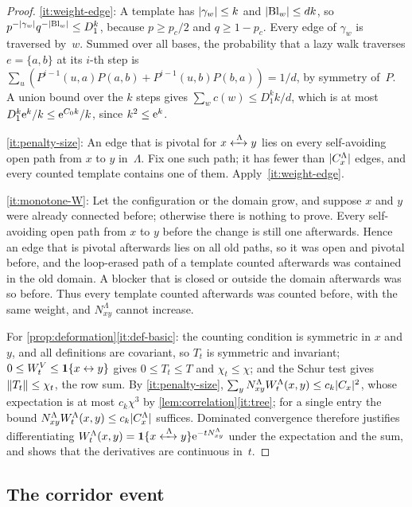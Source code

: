 \begin{proof}
\ref{it:weight-edge}: A template has $\lvert\gamma_w\rvert\le k$ and $\lvert\mathrm{Bl}_w\rvert\le dk$, so
$p^{-\lvert\gamma_w\rvert}q^{-\lvert\mathrm{Bl}_w\rvert}\le D_1^k$, because $p\ge p_c/2$ and $q\ge1-p_c$. Every edge of
$\gamma_w$ is traversed by~$w$. Summed over all bases, the probability that a lazy walk traverses
$e=\{a,b\}$ at its $i$-th step is $\sum_u(P^{i-1}(u,a)P(a,b)+P^{i-1}(u,b)P(b,a))=1/d$, by symmetry of~$P$. A
union bound over the $k$ steps gives $\sum_wc(w)\le D_1^kk/d$, which is at most
$D_1^k\mathrm{e}^k/k\le\mathrm{e}^{C_0k}/k$, since $k^2\le\mathrm{e}^k$.

\ref{it:penalty-size}: An edge that is pivotal for $x\xleftrightarrow{\;\Lambda\;}y$ lies on every self-avoiding
open path from $x$ to $y$ in~$\Lambda$. Fix one such path; it has fewer than $\lvert C^\Lambda_x\rvert$ edges,
and every counted template contains one of them. Apply~\ref{it:weight-edge}.

\ref{it:monotone-W}: Let the configuration or the domain grow, and suppose $x$ and $y$ were already
connected before; otherwise there is nothing to prove. Every self-avoiding open path from $x$ to $y$
before the change is still one afterwards. Hence an edge that is pivotal afterwards lies on all old
paths, so it was open and pivotal before, and the loop-erased path of a template counted afterwards
was contained in the old domain. A blocker that is closed or outside the domain afterwards was so
before. Thus every template counted afterwards was counted before, with the same weight, and
$N^\Lambda_{xy}$ cannot increase.

For \cref{prop:deformation}\ref{it:def-basic}: the counting condition is symmetric in $x$ and $y$, and
all definitions are covariant, so $T_t$ is symmetric and invariant; $0\le W^V_t\le\mathbf{1}\{x\leftrightarrow y\}$ gives
$0\le T_t\le T$ and $\chi_t\le\chi$; and the Schur test gives $\lVert T_t\rVert\le\chi_t$, the row sum. By
\ref{it:penalty-size}, $\sum_yN^\Lambda_{xy}W^\Lambda_t(x,y)\le c_k\lvert C_x\rvert^2$, whose expectation is at
most $c_k\chi^3$ by \cref{lem:correlation}\ref{it:tree}; for a single entry the bound
$N^\Lambda_{xy}W^\Lambda_t(x,y)\le c_k\lvert C^\Lambda_x\rvert$ suffices. Dominated convergence therefore
justifies differentiating $W^\Lambda_t(x,y)=\mathbf{1}\{x\xleftrightarrow{\;\Lambda\;}y\}\mathrm{e}^{-tN^\Lambda_{xy}}$ under the
expectation and the sum, and shows that the derivatives are continuous in~$t$.
\end{proof}

\subsection{The corridor event}\label{sec:calibration}

